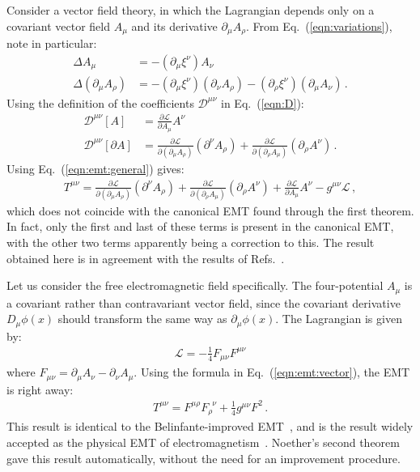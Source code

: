 \documentclass[prd,preprint,
  showpacs,showkeys,lengthcheck,
  nofootinbib,tightenlines,onecolumn,notitlepage,
  preprintnumbers,superscriptaddress]{revtex4-1}
\newcommand{\Lag}{\ensuremath{\mathscr{L}}}
\newcommand{\dx}{\ensuremath{\xi}}
\begin{document}
Consider a vector field theory,
in which the Lagrangian depends only on a covariant
vector field $A_\mu$ and its derivative $\partial_\mu A_\rho$.
From Eq.~(\ref{eqn:variations}), note in particular:
\begin{subequations}
  \begin{align}
    \Delta A_\mu
    &=
    -
    (\partial_\mu \dx^\nu) A_\nu
    \\
    \Delta (\partial_\mu A_\rho)
    &=
    -
    (\partial_\mu \dx^\nu)
    (\partial_\nu A_\rho)
    -
    (\partial_\rho \dx^\nu)
    (\partial_\mu A_\nu)
    \,.
  \end{align}
\end{subequations}
Using the definition of the coefficients $\mathscr{D}^{\mu\nu}$
in Eq.~(\ref{eqn:D}):
\begin{subequations}
  \label{eqn:D:vector}
  \begin{align}
    \mathscr{D}^{\mu\nu}[A]
    &=
    \frac{\partial\Lag}{\partial A_\mu}
    A^\nu
    \\
    \mathscr{D}^{\mu\nu}[\partial A]
    &=
    \frac{\partial\Lag}{\partial(\partial_\mu A_\rho)}
    (\partial^\nu A_\rho)
    +
    \frac{\partial\Lag}{\partial(\partial_\rho A_\mu)}
    (\partial_\rho A^\nu)
    \,.
  \end{align}
\end{subequations}
Using Eq.~(\ref{eqn:emt:general}) gives:
\begin{align}
  \label{eqn:emt:vector}
  T^{\mu\nu}
  =
  \frac{\partial\Lag}{\partial(\partial_\mu A_\rho)}
  (\partial^\nu A_\rho)
  +
  \frac{\partial\Lag}{\partial(\partial_\rho A_\mu)}
  (\partial_\rho A^\nu)
  +
  \frac{\partial\Lag}{\partial A_\mu}
  A^\nu
  -
  g^{\mu\nu}
  \Lag
  \,,
\end{align}
which does not coincide with the canonical EMT found through
the first theorem.
In fact, only the first and last of these terms is present in the canonical EMT,
with the other two terms apparently being a correction to this.
The result obtained here is in agreement with the results of
Refs.~\cite{Felsager:1981iy,Munoz:1996wp,GamboaSaravi:2002vos,GamboaSaravi:2003aq,Montesinos:2006th}.

Let us consider the free electromagnetic field specifically.
The four-potential $A_\mu$ is a covariant rather than contravariant vector field,
since the covariant derivative $D_\mu \phi(x)$ should transform the same way
as $\partial_\mu \phi(x)$.
The Lagrangian is given by:
\begin{align}
  \Lag
  =
  - \frac{1}{4} F_{\mu\nu} F^{\mu\nu}
\end{align}
where $F_{\mu\nu} = \partial_\mu A_\nu - \partial_\nu A_\mu$.
Using the formula in Eq.~(\ref{eqn:emt:vector}),
the EMT is right away:
\begin{align}
  T^{\mu\nu}
  =
  F^{\mu\rho} F_{\rho}^{\phantom{\rho}\nu}
  +
  \frac{1}{4} g^{\mu\nu} F^2
  \,.
\end{align}
This result is identical to the Belinfante-improved EMT~\cite{Belinfante:1939emt},
and is the result widely accepted as the physical EMT of
electromagnetism~\cite{Jackson:1998nia}.
Noether's second theorem gave this result automatically,
without the need for an improvement procedure.
\end{document}
